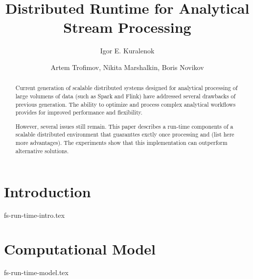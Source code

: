 \documentclass[sigconf]{style/acmart}
\begin{document}
\title {Distributed Runtime for Analytical Stream Processing}


\author{Igor E. Kuralenok}

\author{Artem Trofimov, Nikita Marshalkin, Boris Novikov}


\begin{abstract}
Current generation of scalable distributed systems designed for analytical processing of large volumens of data (such as  Spark and Flink) have addressed several drawbacks of previous generation. The ability to optimize and process complex analytical workflows  provides for improved performance and flexibility.

However, several issues still remain. This paper describes a run-time components of a scalable distributed environment that guaranttes exctly once  processing and (list here more advantages). The experiments show that this implementation can outperform alternative solutions.
\end {abstract}

\maketitle


\section {Introduction}
 {fs-run-time-intro.tex}

\section {Computational Model}
 {fs-run-time-model.tex}
\end{document}
